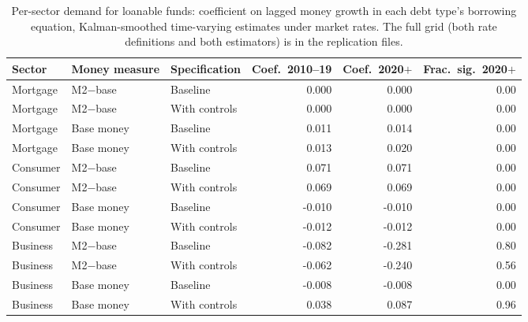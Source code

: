 \begin{table}[htbp]
\centering
\setlength{\belowcaptionskip}{8pt}
\small

\caption{Per-sector demand for loanable funds: coefficient on lagged money growth in each debt type's borrowing equation, Kalman-smoothed time-varying estimates under market rates. The full grid (both rate definitions and both estimators) is in the replication files.}
\label{tab:task5b}
\begin{tabular}{lllrrr}
\toprule
Sector & Money measure & Specification & Coef.\ 2010--19 & Coef.\ 2020$+$ & Frac.\ sig.\ 2020$+$ \\
\midrule
Mortgage & M2$-$base & Baseline & 0.000 & 0.000 & 0.00 \\
Mortgage & M2$-$base & With controls & 0.000 & 0.000 & 0.00 \\
Mortgage & Base money & Baseline & 0.011 & 0.014 & 0.00 \\
Mortgage & Base money & With controls & 0.013 & 0.020 & 0.00 \\
Consumer & M2$-$base & Baseline & 0.071 & 0.071 & 0.00 \\
Consumer & M2$-$base & With controls & 0.069 & 0.069 & 0.00 \\
Consumer & Base money & Baseline & -0.010 & -0.010 & 0.00 \\
Consumer & Base money & With controls & -0.012 & -0.012 & 0.00 \\
Business & M2$-$base & Baseline & -0.082 & -0.281 & 0.80 \\
Business & M2$-$base & With controls & -0.062 & -0.240 & 0.56 \\
Business & Base money & Baseline & -0.008 & -0.008 & 0.00 \\
Business & Base money & With controls & 0.038 & 0.087 & 0.96 \\
\bottomrule
\end{tabular}
\end{table}

